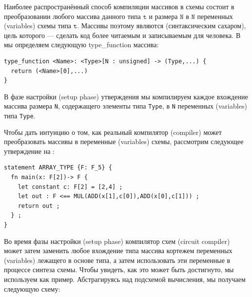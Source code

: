 Наиболее распространённый способ компиляции массивов в схемы состоит в преобразовании любого массива данного типа $\texttt{t}$ и размера $\texttt{N}$ в $\texttt{N}$ переменных (variables) схемы типа $\texttt{t}$. Массивы поэтому являются  (синтаксическим сахаром), цель которого --- сделать код более читаемым и записываемым для человека. В  мы определяем следующую type\_function массива:
\begin{lstlisting}
type_function <Name>: <Type>[N : unsigned] -> (Type,...) { 
  return (<Name>[0],...)
}
\end{lstlisting}
В фазе настройки (setup phase) утверждения мы компилируем каждое вхождение массива размера \texttt{N}, содержащего элементы типа \texttt{Type}, в \texttt{N} переменных (variables) типа \texttt{Type}.
\begin{example} Чтобы дать интуицию о том, как реальный компилятор (compiler) может преобразовать массивы в переменные (variables) схемы, рассмотрим следующее утверждение на :
\begin{lstlisting}
statement ARRAY_TYPE {F: F_5} {
  fn main(x: F[2])-> F {
  	let constant c: F[2] = [2,4] ;
  	let out : F <== MUL(ADD(x[1],c[0]),ADD(x[0],c[1])) ;
  	return out ;
  } ;
}
\end{lstlisting}
Во время фазы настройки (setup phase) компилятор схем (circuit compiler) может затем заменить любое вхождение типа массива кортежем переменных (variables) лежащего в основе типа, а затем использовать эти переменные в процессе синтеза схемы. Чтобы увидеть, как это может быть достигнуто, мы используем  как пример. Абстрагируясь над подсхемой вычисления, мы получаем следующую схему:
\begin{center}
\end{center}
\end{example}
